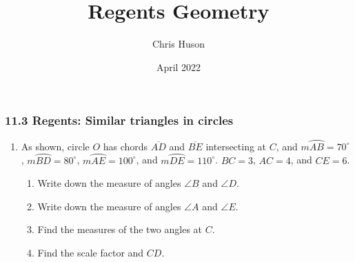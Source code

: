 \documentclass[12pt, oneside]{article}
\title{Regents Geometry}
\author{Chris Huson}
\date{April 2022}
\begin{document}
\subsubsection*{11.3 Regents: Similar triangles in circles}
\begin{enumerate}[itemsep=1.7cm]
\item As shown, circle $O$ has chords $\overline{AD}$ and $\overline{BE}$ intersecting at $C$, and $m \wideparen{AB}=70^\circ$, $m \wideparen{BD}=80^\circ$, $m \wideparen{AE}=100^\circ$, and $m \wideparen{DE}=110^\circ$. $BC=3$, $AC=4$, and $CE=6$.
  \begin{multicols}{2}
  \raggedcolumns
  \begin{flushright}
  \end{flushright}
  \begin{enumerate}
    \item Write down the measure of angles $\angle B$ and $\angle D$. \vspace{0.5cm}
    \item Write down the measure of angles $\angle A$ and $\angle E$. \vspace{0.5cm}
    \item Find the measures of the two angles at $C$. \vspace{1.5cm}
    \item Find the scale factor and $CD$.
    \end{enumerate}
  \end{multicols}
  \vspace{1cm}


\end{enumerate}
\end{document}
